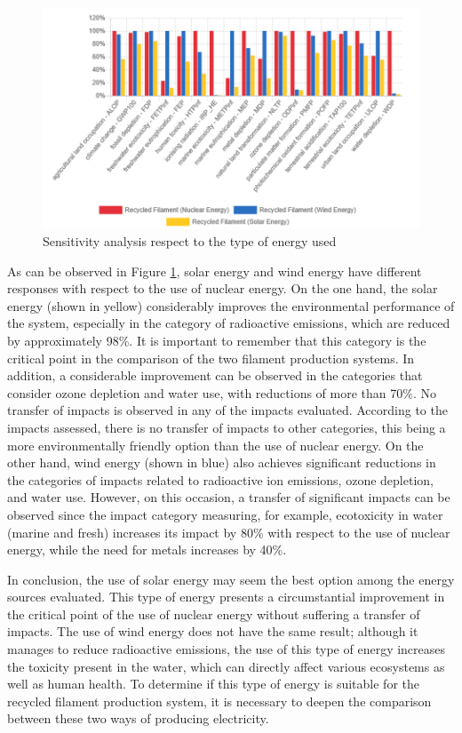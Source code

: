 \documentclass[12pt]{elsarticle} %
\begin{document}
\begin{figure}[H]

{\centering \includegraphics[width=0.9\linewidth,]{Figures/Figure-5} 

}

\caption{Sensitivity analysis respect to the type of energy used}\label{fig:figure5}
\end{figure}

As can be observed in Figure \ref{fig:figure5}, solar energy and wind energy have different responses with respect to the use of nuclear energy.
On the one hand, the solar energy (shown in yellow) considerably improves the environmental performance of the system, especially in the category of radioactive emissions, which are reduced by approximately 98\%.
It is important to remember that this category is the critical point in the comparison of the two filament production systems.
In addition, a considerable improvement can be observed in the categories that consider ozone depletion and water use, with reductions of more than 70\%.
No transfer of impacts is observed in any of the impacts evaluated.
According to the impacts assessed, there is no transfer of impacts to other categories, this being a more environmentally friendly option than the use of nuclear energy.
On the other hand, wind energy (shown in blue) also achieves significant reductions in the categories of impacts related to radioactive ion emissions, ozone depletion, and water use.
However, on this occasion, a transfer of significant impacts can be observed since the impact category measuring, for example, ecotoxicity in water (marine and fresh) increases its impact by 80\% with respect to the use of nuclear energy, while the need for metals increases by 40\%.

In conclusion, the use of solar energy may seem the best option among the energy sources evaluated.
This type of energy presents a circumstantial improvement in the critical point of the use of nuclear energy without suffering a transfer of impacts.
The use of wind energy does not have the same result; although it manages to reduce radioactive emissions, the use of this type of energy increases the toxicity present in the water, which can directly affect various ecosystems as well as human health.
To determine if this type of energy is suitable for the recycled filament production system, it is necessary to deepen the comparison between these two ways of producing electricity.
\end{document}
